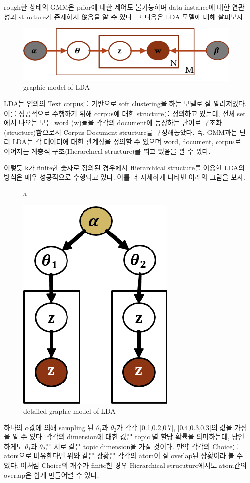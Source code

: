 \documentclass[a4paper]{oblivoir}
\begin{document}
rough한 상태의 GMM은 prior에 대한 제어도 불가능하며 data instance에 대한 연관성과 structure가 존재하지 않음을 알 수 있다. 그 다음은 LDA 모델에 대해 살펴보자. 
\begin{figure}[ht] \centering 
\begin{center}
\includegraphics[scale=0.6]{fig13_2.png} 
\caption{graphic model of LDA}
\label{fig:13-11}
\end{center}
\end{figure}
LDA는 임의의 Text corpus를 기반으로 soft clustering을 하는 모델로 잘 알려져있다. 이를 성공적으로 수행하기 위해 corpus에 대한 structure를 정의하고 있는데,  전체 set에서 나오는 모든 word (w)들을 각각의 document에 등장하는 단어로 구조화 (structure)함으로서 Corpus-Document structure를 구성해놓았다. 즉, GMM과는 달리 LDA는 각 데이터에 대한 관계성을 정의할 수 있으며 word, document, corpus로 이어지는 계층적 구조(Hierarchical structure)를 띄고 있음을 알 수 있다. 

이렇듯 k가 finite한 숫자로 정의된 경우에서 Hierarchical structure를 이용한 LDA의 방식은 매우 성공적으로 수행되고 있다. 이를 더 자세하게 나타낸 아래의 그림을 보자. 
\begin{figure}[ht] \centering a
\begin{center}
\includegraphics[scale=0.6]{fig13_11.png} 
\caption{detailed graphic model of LDA}
\label{fig:13-12}
\end{center}
\end{figure}
하나의 $\alpha$값에 의해 sampling 된 $\theta_{1}$과 $\theta_{2}$가 각각 [0.1,0.2,0.7], [0.4,0.3,0.3]의 값을 가짐을 알 수 있다. 각각의 dimension에 대한 값은 topic 별 할당 확률을 의미하는데, 당연하게도 $\theta_{1}$과 $\theta_{2}$은 서로 같은 topic dimension을 가질 것이다. 만약 각각의 Choice를 atom으로 비유한다면 위와 같은 상황은 각각의 atom이 잘 overlap된 상황이라 볼 수 있다. 이처럼 Choice의 개수가 finite한 경우 Hierarchical strucuture에서도 atom간의 overlap은 쉽게 만들어낼 수 있다.  
\end{document}
